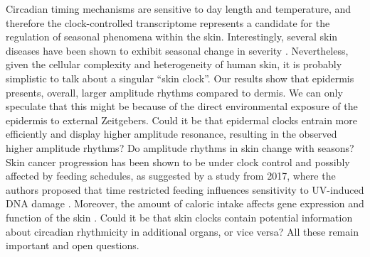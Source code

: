 Circadian timing mechanisms are sensitive to day length and temperature, and therefore the clock-controlled transcriptome represents a candidate for the regulation of seasonal phenomena within the skin. Interestingly, several skin diseases have been shown to exhibit seasonal change in severity \cite{Weiss2008}. Nevertheless, given the cellular complexity and heterogeneity of human skin, it is probably simplistic to talk about a singular ``skin clock''. Our results show that epidermis presents, overall, larger amplitude rhythms compared to dermis. We can only speculate that this might be because of the direct environmental exposure of the epidermis to external Zeitgebers. Could it be that epidermal clocks entrain more efficiently and display higher amplitude resonance, resulting in the observed higher amplitude rhythms? Do amplitude rhythms in skin change with seasons? Skin cancer progression has been shown to be under clock control \cite{Gaddameedhi2011} and possibly affected by feeding schedules, as suggested by a study from 2017, where the authors proposed that time restricted feeding influences sensitivity to UV-induced DNA damage \cite{Wang2017}. Moreover, the amount of caloric intake affects gene expression and function of the skin \cite{Forni2017}. Could it be that skin clocks contain potential information about circadian rhythmicity in additional organs, or vice versa? All these remain important and open questions. \\ %


